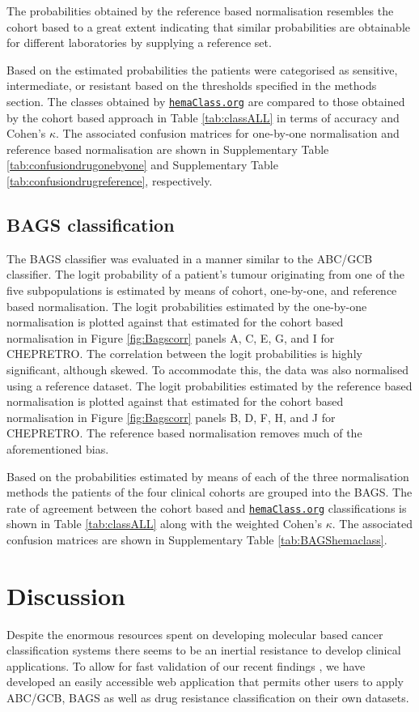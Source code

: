 \documentclass{article}
\newcommand{\hemaClass}{\href{http://hemaClass.org}{\texttt{hemaClass.org}}}
\begin{document}
The probabilities obtained by the reference based normalisation resembles the cohort based to a great extent indicating that similar probabilities are obtainable for different laboratories by supplying a reference set.

Based on the estimated probabilities the patients were categorised as sensitive, intermediate, or resistant based on the thresholds specified in the methods section.
The classes obtained by \hemaClass{} are compared to those obtained by the cohort based approach in Table \ref{tab:classALL} in terms of accuracy and Cohen's $\kappa$.
The associated confusion matrices for one-by-one normalisation and reference based normalisation are shown in Supplementary Table \ref{tab:confusiondrugonebyone} and Supplementary Table \ref{tab:confusiondrugreference}, respectively.

\subsection{BAGS classification}

The BAGS classifier was evaluated in a manner similar to the ABC/GCB classifier.
The logit probability of a patient's tumour originating from one of the five subpopulations is estimated by means of cohort, one-by-one, and reference based normalisation.
The logit probabilities estimated by the one-by-one normalisation is plotted against that estimated for the cohort based normalisation in Figure \ref{fig:Bagscorr} panels A, C, E, G, and I for CHEPRETRO.
The correlation between the logit probabilities is highly significant, although skewed.
To accommodate this, the data was also normalised using a reference dataset.
The logit probabilities estimated by the reference based normalisation is plotted against that estimated for the cohort based normalisation in Figure \ref{fig:Bagscorr} panels B, D, F, H, and J for CHEPRETRO.
The reference based normalisation removes much of the aforementioned bias.

Based on the probabilities estimated by means of each of the three normalisation methods the patients of the four clinical cohorts are grouped into the BAGS.
The rate of agreement between the cohort based and \hemaClass{} classifications is shown in Table \ref{tab:classALL} along with the weighted Cohen's $\kappa$.
The associated confusion matrices are shown in Supplementary Table \ref{tab:BAGShemaclass}.




\section{Discussion}
Despite the enormous resources spent on developing molecular based cancer classification systems there seems to be an inertial resistance to develop clinical applications.
To allow for fast validation of our recent findings \citep{DybkaerBoegsted2015, Falgreen2015}, we have developed an easily accessible web application that permits other users to apply ABC/GCB, BAGS as well as drug resistance classification on their own datasets.
\end{document}
